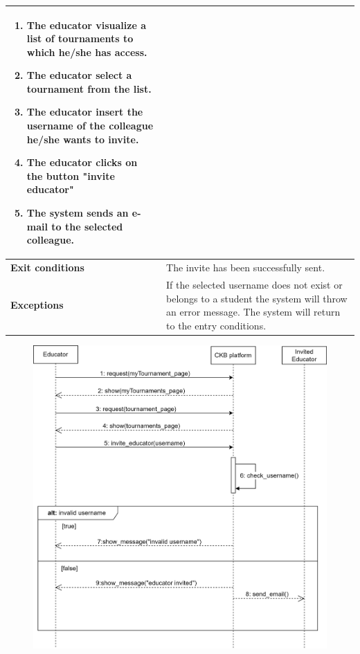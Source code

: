 \begin{enumerate}[label=\textbf{UC.\arabic*}]
\begin{table}[h]
\begin{tabular}{|m{3.2cm}|m{9.8cm}|}
\begin{enumerate}[label=\arabic*.]
                        \item The educator visualize a list of tournaments to which he/she has access.
                        \item The educator select a tournament from the list.
                        \item The educator insert the username of the colleague he/she wants to invite.
                        \item The educator clicks on the button "invite educator"
                        \item The system sends an e-mail to the selected colleague.
                    \end{enumerate}\\
                    \hline
                    \textbf{Exit conditions}  & The invite has been successfully sent. \\
                    \hline
                    \textbf{Exceptions} & If the selected username does not exist or belongs to a student the system will throw an error message. The system will return to the entry conditions. \\
                    \hline
                \end{tabular}
        \end{table}
        \begin{figure}[h]
            \centering
            \includegraphics[scale = 0.7]{images/sd/inviteE.png}

\end{figure}
\end{enumerate}
